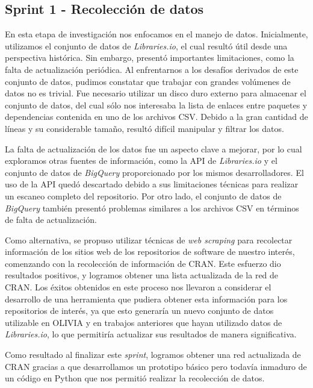 \subsection{Sprint 1 - Recolección de datos}

En esta etapa de investigación nos enfocamos en el manejo de datos. Inicialmente, utilizamos el conjunto de datos 
de \textit{Libraries.io}\cite{jeremy_katz_2020_3626071}, el cual resultó útil desde una perspectiva histórica. Sin embargo, presentó importantes 
limitaciones, como la falta de actualización periódica. Al enfrentarnos a los desafíos derivados de este conjunto 
de datos, pudimos constatar que trabajar con grandes volúmenes de datos no es trivial. Fue necesario utilizar un 
disco duro externo para almacenar el conjunto de datos, del cual sólo nos interesaba la lista de enlaces entre 
paquetes y dependencias contenida en uno de los archivos CSV. Debido a la gran cantidad de líneas y su considerable 
tamaño, resultó difícil manipular y filtrar los datos.

La falta de actualización de los datos fue un aspecto clave a mejorar, por lo cual exploramos otras fuentes de información, 
como la API de \textit{Libraries.io} y el conjunto de datos de \textit{BigQuery} proporcionado por los mismos desarrolladores. 
El uso de la API quedó descartado debido a sus limitaciones técnicas para realizar un escaneo completo del repositorio. 
Por otro lado, el conjunto de datos de \textit{BigQuery} también presentó problemas similares a los archivos CSV en 
términos de falta de actualización.

Como alternativa, se propuso utilizar técnicas de \textit{web scraping} para recolectar información de los sitios web 
de los repositorios de software de nuestro interés, comenzando con la recolección de información de CRAN. Este esfuerzo 
dio resultados positivos, y logramos obtener una lista actualizada de la red de CRAN. Los éxitos obtenidos en este 
proceso nos llevaron a considerar el desarrollo de una herramienta que pudiera obtener esta información para los 
repositorios de interés, ya que esto generaría un nuevo conjunto de datos utilizable en OLIVIA y en trabajos anteriores 
que hayan utilizado datos de \textit{Libraries.io}, lo que permitiría actualizar sus resultados de manera significativa.

Como resultado al finalizar este \textit{sprint}, logramos obtener una red actualizada de CRAN gracias a que desarrollamos 
un prototipo básico pero todavía inmaduro de un código en Python que nos permitió realizar la recolección de datos.

